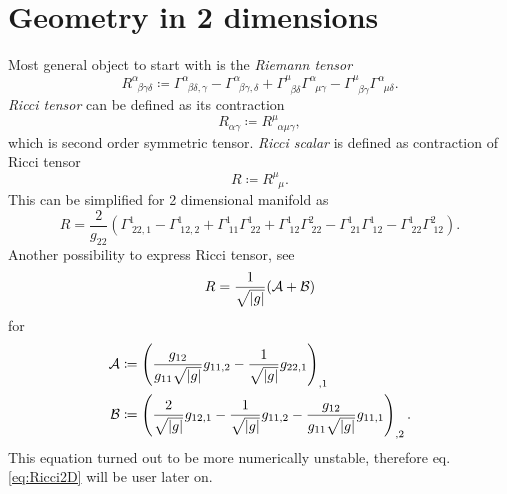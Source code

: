\section{Geometry in 2 dimensions}
Most general object to start with is the \emph{Riemann tensor}
\begin{equation}
    R^\alpha_{\;\;\beta\gamma\delta}\coloneqq \Gamma^\alpha_{\;\;\beta\delta,\gamma}-\Gamma^\alpha_{\;\;\beta\gamma,\delta}+\Gamma^\mu_{\;\;\beta\delta}\Gamma^\alpha_{\;\;\mu\gamma}-\Gamma^\mu_{\;\;\beta\gamma}\Gamma^\alpha_{\;\;\mu\delta}.
\end{equation}
\emph{Ricci tensor} can be defined as its contraction 
\begin{equation}
    R_{\alpha\gamma}\coloneqq R^\mu_{\;\;\alpha\mu\gamma},
\end{equation}
which is second order symmetric tensor.
\emph{Ricci scalar} is defined as contraction of Ricci tensor
\begin{equation}
    R\coloneqq R^\mu_{\;\;\mu}.
\end{equation}
This can be simplified for 2 dimensional manifold as
\begin{equation}
    R=\frac{2}{g_{22}}\left(\Gamma^1_{\;22,1}-\Gamma^1_{\;12,2}+\Gamma^1_{\;11}\Gamma^1_{\;22}+\Gamma^1_{\;12}\Gamma^2_{\;22}-\Gamma^1_{\;21}\Gamma^1_{\;12}-\Gamma^1_{\;22}\Gamma^2_{\;12}\right).
    \label{eq:Ricci2D}
\end{equation}
Another possibility to express Ricci tensor, see \citet[eq. 6,7]{geometricTensorLipkin}
\begin{equation}
    R=\frac{1}{\sqrt{\left|{g}\right|}}(\mathcal{A}+\mathcal{B})
\end{equation}
for
\begin{align}
    \mathcal{A}&\coloneqq \left(\frac{g_{12}}{g_{11}\sqrt{\left|{g}\right|}}g_{11,2}-\frac{1}{\sqrt{\left|{g}\right|}}g_{22,1}\right)_{,1}\\
    \mathcal{B}&\coloneqq \left(\frac{2}{\sqrt{\left|{g}\right|}}g_{12,1}-\frac{1}{\sqrt{\left|{g}\right|}}g_{11,2}-\frac{g_{12}}{g_{11}\sqrt{\left|{g}\right|}}g_{11,1}\right)_{,2}.
\end{align}
This equation turned out to be more numerically unstable, therefore eq. \ref{eq:Ricci2D} will be user later on.


